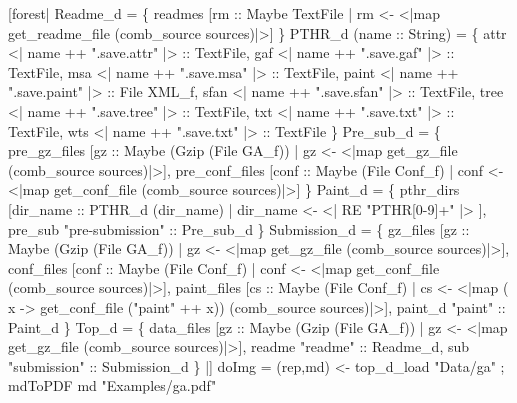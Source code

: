 \begin{code}
[forest|
   Readme_d =  \{
    readmes  [rm :: Maybe TextFile | rm <- <|map get_readme_file (comb_source sources)|>]
  \}
\mbox{}
   PTHR_d (name :: String)  =  \{
   attr    <| name ++ ".save.attr"  |> :: TextFile,
   gaf     <| name ++ ".save.gaf"   |> :: TextFile,
   msa     <| name ++ ".save.msa"   |> :: TextFile,
   paint   <| name ++ ".save.paint" |> :: File XML_f,
   sfan    <| name ++ ".save.sfan"  |> :: TextFile,
   tree    <| name ++ ".save.tree"  |> :: TextFile,
   txt     <| name ++ ".save.txt"   |> :: TextFile, 
   wts     <| name ++ ".save.txt"   |> :: TextFile
  \}
\mbox{}
   Pre_sub_d =  \{
    pre_gz_files    [gz   :: Maybe (Gzip (File GA_f)) | gz   <- <|map get_gz_file   (comb_source sources)|>],
    pre_conf_files  [conf :: Maybe (File Conf_f)      | conf <- <|map get_conf_file (comb_source sources)|>]
  \}
\mbox{}
   Paint_d =  \{
    pthr_dirs  [dir_name :: PTHR_d (dir_name) | dir_name <-  <| RE "PTHR[0-9]+" |> ],
    pre_sub    "pre-submission" :: Pre_sub_d
  \}
\mbox{}
   Submission_d =  \{
    gz_files     [gz   :: Maybe (Gzip (File GA_f)) | gz   <- <|map get_gz_file   (comb_source sources)|>],
    conf_files   [conf :: Maybe (File Conf_f)      | conf <- <|map get_conf_file (comb_source sources)|>],
    paint_files  [cs   :: Maybe (File Conf_f) 
                        | cs <- <|map (\\x -> get_conf_file ("paint" ++ x)) (comb_source sources)|>], 
    paint_d      "paint"               :: Paint_d
  \}
\mbox{}
   Top_d =  \{
    data_files  [gz :: Maybe (Gzip (File GA_f)) | 
			gz <- <|map get_gz_file (comb_source sources)|>],
    readme      "readme"             :: Readme_d,
    sub         "submission"         :: Submission_d
  \}
|]
\mbox{}
doImg = 
 { (rep,md) <- top_d_load "Data/ga"
 ; mdToPDF md "Examples/ga.pdf"
 }
\end{code}

